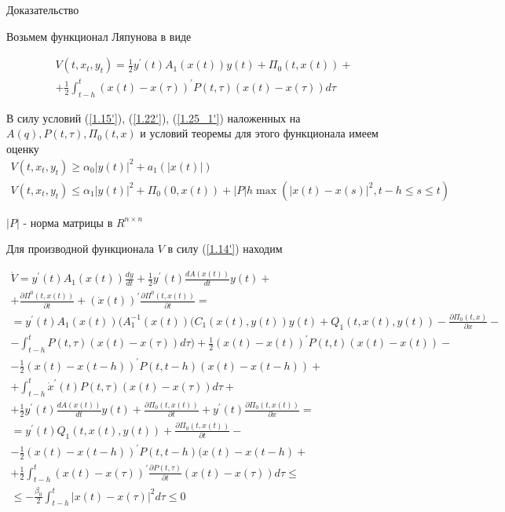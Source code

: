 Доказательство

Возьмем функционал Ляпунова в виде 

\begin{equation} \label{1.26'}
	\begin{array}{c}
		\displaystyle V(t, x_t, y_t) = \frac12 y^{'} (t) A_1(x(t)) y(t) + \Pi_0(t, x(t)) +\\
		\displaystyle + \frac12 \int_{t-h}^{t} (x(t) - x(\tau))^{'} P(t, \tau) (x(t) - x (\tau)) d \tau
	\end{array}
\end{equation}

В силу условий (\ref{1.15'}), (\ref{1.22'}), (\ref{1.25_1'}) наложенных на $A(q), P(t, \tau), \Pi_0(t, x)$ и условий теоремы для этого функционала имеем оценку
$$
\begin{array}{c}
	V(t, x_t, y_t) \ge \alpha_0 \left| y(t) \right| ^2 + a_1 (\left| x(t) \right|)\\
	V(t, x_t, y_t) \le \alpha_1 \left| y(t) \right| ^2 + \Pi_0 (0, x(t)) + \left| P \right| h \max (\left| x(t) - x(s) \right| ^2, t-h \le s \le t)
\end{array}
$$

$\left| P \right|$ - норма матрицы в $R^{n \times n}$

Для производной функционала $V$ в силу (\ref{1.14'}) находим

$$
\begin{array}{c}
\displaystyle \dot V = y^{'} (t) A_1 (x(t)) \frac{dy}{dt} + \frac12 y^{'} (t) \frac{d A(x(t))}{dt} y(t) +\\+
\displaystyle \frac{\partial \Pi^0 (t, x(t))}{\partial t} + (\dot x (t))^{'} \frac{\partial \Pi^0 (t, x(t))}{\partial t} =\\
\displaystyle = y^{'} (t) A_1 (x(t)) ( A_1^{-1} (x(t)) (C_1 (x(t), y(t)) y(t) + Q_1 (t, x(t), y(t)) - \frac{\partial \Pi_0 (t, x)}{\partial x} -\\
\displaystyle - \int_{t - h}^{t} P(t, \tau) (x(t) - x(\tau)) d \tau) + \frac12 (x(t) - x(t))^{'} P(t, t) (x(t) - x(t)) -\\
\displaystyle - \frac12 (x(t) - x(t - h))^{'} P(t, t - h) (x(t) - x(t - h)) +\\
\displaystyle + \int_{t - h}^{t} \dot x^{'} (t) P(t, \tau) (x(t) - x(\tau)) d \tau +\\
\displaystyle + \frac12 y^{'}(t) \frac{d A(x(t))}{dt} y(t) + \frac{\partial \Pi_0 (t, x(t))}{\partial t} + y^{'}(t) \frac{\partial \Pi_0 (t, x(t))}{\partial x} =\\
\displaystyle = y^{'} (t) Q_1 (t, x(t), y(t)) + \frac{\partial \Pi_0 (t, x(t))}{\partial t} -\\
\displaystyle - \frac12 (x(t) - x(t - h))^{'} P (t, t - h) (x(t) - x(t - h) +\\
\displaystyle + \frac12 \int_{t - h}^{t} (x(t) - x(\tau))^{'} \frac{\partial P(t, \tau)}{\partial t} (x(t) - x(\tau)) d \tau \le\\
\displaystyle \le - \frac{\beta_0}{2} \int_{t-h}^{t} \left| x(t) - x(\tau) \right| ^2 d \tau \le 0
\end{array}
$$


